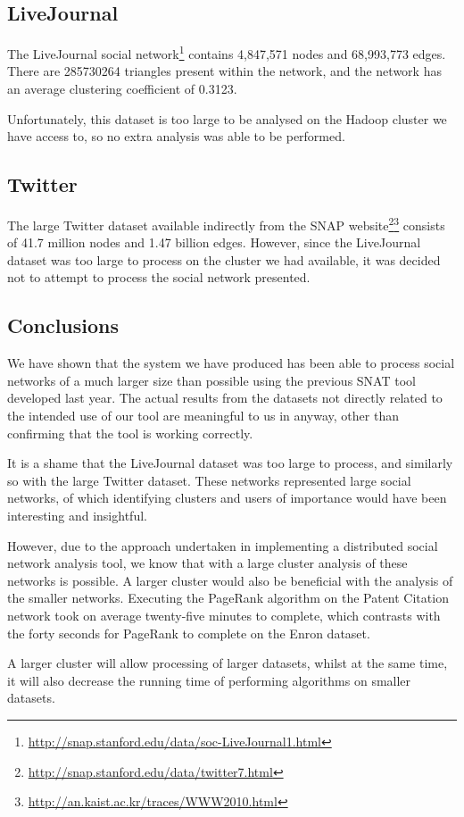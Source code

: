 \subsection{LiveJournal}
The LiveJournal social network\footnote{\url{http://snap.stanford.edu/data/soc-LiveJournal1.html}} contains 4,847,571 nodes and 68,993,773 edges. There are 285730264 triangles present within the network, and the network has an average clustering coefficient of 0.3123.

Unfortunately, this dataset is too large to be analysed on the Hadoop cluster we have access to, so no extra analysis was able to be performed.

\subsection{Twitter}
The large Twitter dataset available indirectly from the SNAP website\footnote{\url{http://snap.stanford.edu/data/twitter7.html}}\footnote{\url{http://an.kaist.ac.kr/traces/WWW2010.html}} consists of 41.7 million nodes and 1.47 billion edges. However, since the LiveJournal dataset was too large to process on the cluster we had available, it was decided not to attempt to process the social network presented.

\subsection{Conclusions}
We have shown that the system we have produced has been able to process social
networks of a much larger size than possible using the previous SNAT tool
developed last year. The actual results from the datasets not directly related
to the intended use of our tool are meaningful to us in anyway, other than
confirming that the tool is working correctly.

It is a shame that the LiveJournal dataset was too large to process, and
similarly so with the large Twitter dataset. These networks represented large
social networks, of which identifying clusters and users of importance would
have been interesting and insightful.

However, due to the approach undertaken in implementing a distributed social
network analysis tool, we know that with a large cluster analysis of these
networks is possible. A larger cluster would also be beneficial with the
analysis of the smaller networks. Executing the PageRank algorithm on the
Patent Citation network took on average twenty-five minutes to complete, which
contrasts with the forty seconds for PageRank to complete on the Enron dataset.

A larger cluster will allow processing of larger datasets, whilst at the same
time, it will also decrease the running time of performing algorithms on
smaller datasets.